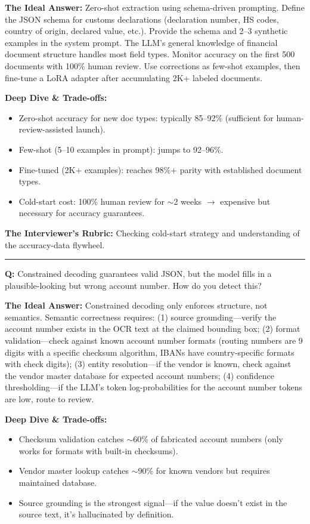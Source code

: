 \textbf{The Ideal Answer:} Zero-shot extraction using schema-driven prompting. Define the JSON schema for customs declarations (declaration number, HS codes, country of origin, declared value, etc.). Provide the schema and 2--3 synthetic examples in the system prompt. The LLM's general knowledge of financial document structure handles most field types. Monitor accuracy on the first 500 documents with 100\% human review. Use corrections as few-shot examples, then fine-tune a LoRA adapter after accumulating 2K+ labeled documents.

\textbf{Deep Dive \& Trade-offs:}
\begin{itemize}
  \item Zero-shot accuracy for new doc types: typically 85--92\% (sufficient for human-review-assisted launch).
  \item Few-shot (5--10 examples in prompt): jumps to 92--96\%.
  \item Fine-tuned (2K+ examples): reaches 98\%+ parity with established document types.
  \item Cold-start cost: 100\% human review for $\sim$2 weeks $\rightarrow$ expensive but necessary for accuracy guarantees.
\end{itemize}

\textbf{The Interviewer's Rubric:} Checking cold-start strategy and understanding of the accuracy-data flywheel.

\bigskip\hrule\bigskip

\textbf{Q:} Constrained decoding guarantees valid JSON, but the model fills in a plausible-looking but wrong account number. How do you detect this?

\textbf{The Ideal Answer:} Constrained decoding only enforces structure, not semantics. Semantic correctness requires: (1) source grounding---verify the account number exists in the OCR text at the claimed bounding box; (2) format validation---check against known account number formats (routing numbers are 9 digits with a specific checksum algorithm, IBANs have country-specific formats with check digits); (3) entity resolution---if the vendor is known, check against the vendor master database for expected account numbers; (4) confidence thresholding---if the LLM's token log-probabilities for the account number tokens are low, route to review.

\textbf{Deep Dive \& Trade-offs:}
\begin{itemize}
  \item Checksum validation catches $\sim$60\% of fabricated account numbers (only works for formats with built-in checksums).
  \item Vendor master lookup catches $\sim$90\% for known vendors but requires maintained database.
  \item Source grounding is the strongest signal---if the value doesn't exist in the source text, it's hallucinated by definition.
\end{itemize}

